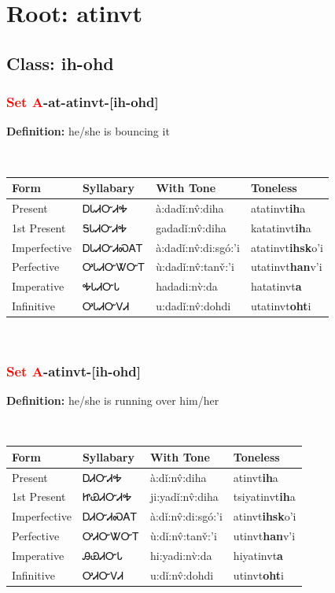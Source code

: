 \needspace{4in}
\section*{Root: atinvt}
\nopagebreak
{}
\needspace{3in}
\subsection*{Class: ih-ohd}
\nopagebreak
\needspace{2in}
\subsubsection*{\textcolor{Red}{Set A}{-}at{-}\textbf{atinvt}{-}[ih-ohd]}
\nopagebreak
\textbf{Definition: } he/she is bouncing it
\\[0.5em]
\begin{tabularx}{\textwidth}{l X X X}%
\toprule%
\textbf{Form}&\textbf{Syllabary}&\textbf{With Tone}&\textbf{Toneless}\\%
\midrule%
Present&ᎠᏓᏗᏅᏗᎭ&à:dadǐ:nv̂:diha&atatinvt\textbf{ih}a\\%
1st Present&ᎦᏓᏗᏅᏗᎭ&gadadǐ:nv̂:diha&katatinvt\textbf{ih}a\\%
Imperfective&ᎠᏓᏗᏅᏗᏍᎪᎢ&à:dadǐ:nv̂:di:sgó:’i&atatinvt\textbf{ihsk}o'i\\%
Perfective&ᎤᏓᏗᏅᏔᏅᎢ&ù:dadǐ:nv̂:tanv̌:’i&utatinvt\textbf{han}v'i\\%
Imperative&ᎭᏓᏗᏅᏓ&hadadi:nv̀:da&hatatinvt\textbf{a}\\%
Infinitive&ᎤᏓᏗᏅᏙᏗ&u:dadǐ:nv̂:dohdi&utatinvt\textbf{oht}i\\%
\bottomrule%
\end{tabularx}
\\[1em]
\needspace{2in}
\subsubsection*{\textcolor{Red}{Set A}{-}\textbf{atinvt}{-}[ih-ohd]}
\nopagebreak
\textbf{Definition: } he/she is running over him/her
\\[0.5em]
\begin{tabularx}{\textwidth}{l X X X}%
\toprule%
\textbf{Form}&\textbf{Syllabary}&\textbf{With Tone}&\textbf{Toneless}\\%
\midrule%
Present&ᎠᏗᏅᏗᎭ&à:dǐ:nv̂:diha&atinvt\textbf{ih}a\\%
1st Present&ᏥᏯᏗᏅᏗᎭ&ji:yadǐ:nv̂:diha&tsiyatinvt\textbf{ih}a\\%
Imperfective&ᎠᏗᏅᏗᏍᎪᎢ&à:dǐ:nv̂:di:sgó:’i&atinvt\textbf{ihsk}o'i\\%
Perfective&ᎤᏗᏅᏔᏅᎢ&ù:dǐ:nv̂:tanv̌:’i&utinvt\textbf{han}v'i\\%
Imperative&ᎯᏯᏗᏅᏓ&hi:yadi:nv̀:da&hiyatinvt\textbf{a}\\%
Infinitive&ᎤᏗᏅᏙᏗ&u:dǐ:nv̂:dohdi&utinvt\textbf{oht}i\\%
\bottomrule%
\end{tabularx}
\\[1em]